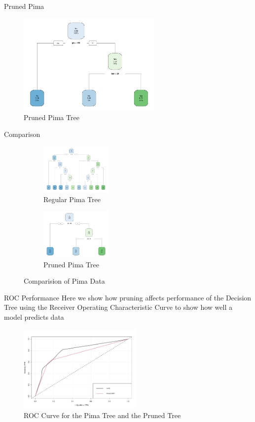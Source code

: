 \documentclass[12pt]{beamer}
\begin{document}
\begin{frame}{Pruned Pima}
\begin{figure}
    \centering
    \includegraphics[width=7cm]{presentation/pimaprune.pdf}
    \caption{Pruned Pima Tree}
    \label{fig:pima2}
\end{figure}
\end{frame}

\begin{frame}{Comparison}
\begin{figure}
\centering
\begin{subfigure}{0.4\linewidth}
    \centering
    \includegraphics[width = 3.5cm]{presentation/pimatrain.pdf}
    \caption{Regular Pima Tree}
    \label{fig:pima3}
\end{subfigure}
\begin{subfigure}{0.4\linewidth}
    \centering
    \includegraphics[width = 3.5cm]{presentation/pimaprune.pdf}
    \caption{Pruned Pima Tree}
    \label{fig:pima4}
\end{subfigure}
\caption{Comparision of Pima Data}
\label{fig:pima}
\end{figure}  
\end{frame}

\begin{frame}{ROC Performance}
   Here we show how pruning affects performance of the Decision Tree using the Receiver Operating Characteristic Curve to show how well a model predicts data
   \begin{figure}
       \centering
       \includegraphics[width=6cm]{presentation/pimaroc.pdf}
       \caption{ROC Curve for the Pima Tree and the Pruned Tree}
       \label{fig:pimaroc}
   \end{figure}
\end{frame}
\end{document}
